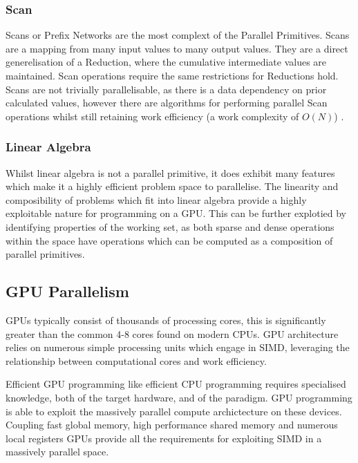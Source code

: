 \FloatBarrier
\subsubsection{Scan}

Scans or Prefix Networks are the most complext of the Parallel Primitives. Scans are a mapping from
many input values to many output values. They are a direct generelisation of a Reduction, where the
cumulative intermediate values are maintained. Scan operations require the same restrictions for
Reductions hold. Scans are not trivially parallelisable, as there is a data dependency on
prior calculated values, however there are algorithms for performing parallel Scan operations whilst
still retaining work efficiency (a work complexity of $ O(N) $) \cite{ScanOp}.

\FloatBarrier
\subsubsection{Linear Algebra}
Whilst linear algebra is not a parallel primitive, it does exhibit many features which make it a
highly efficient problem space to parallelise. The linearity and composibility of problems which fit
into linear algebra provide a highly exploitable nature for programming on a GPU. This can be
further explotied by identifying properties of the working set, as both sparse and dense operations
within the space have operations which can be computed as a composition of parallel
primitives\cite{gallivan1990parallel}. 

\FloatBarrier
\subsection{GPU Parallelism}
GPUs typically consist of thousands of processing cores, this is significantly greater than the
common 4-8 cores found on modern CPUs. GPU architecture relies on numerous simple processing units
which engage in SIMD, leveraging the relationship between computational cores and work efficiency.


Efficient GPU programming like efficient CPU programming requires specialised knowledge, both of the
target hardware, and of the paradigm. GPU programming is able to exploit the massively parallel
compute archictecture on these devices. Coupling fast global memory, high performance shared memory
and numerous local registers GPUs provide all the requirements for exploiting SIMD in a massively
parallel space.




